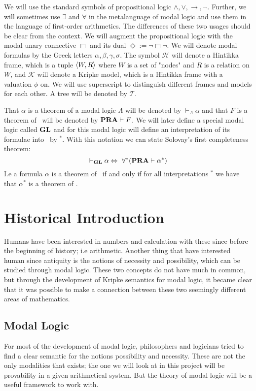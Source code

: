 \documentclass[../main.tex]{subfiles}
\begin{document}
We will use the standard symbols of propositional  logic
$\wedge,\vee,\rightarrow,\neg$. Further, we will sometimes use $\exists$ and
$\forall$ in the metalanguage of modal logic and use them in the language of
first-order arithmetics. The differences of these two usages should be clear
from the context. We will augment the propositional logic with the modal unary
connective $\Box$ and its dual $\Diamond:=\neg\Box\neg$. We will denote modal
formulas by the Greek letters $\alpha,\beta,\gamma,\sigma$. The symbol
$\mathcal{H}$ will denote a
Hintikka frame,  which is a tuple $\langle W,R\rangle$ where $W$ is a set of "nodes" and
$R$ is a relation on $W$, and
$\mathcal{K}$ will denote a Kripke model, which is a Hintikka frame with a
valuation $\phi$ on. We will use superscript to distinguish different frames
and models for each other.
A tree will be denoted by $\mathcal{T}$.

That $\alpha$ is a theorem of a modal logic $\Lambda$ will be denoted by
$\vdash_\Lambda\alpha$ and that $F$ is a theorem of \PRA\ will be denoted by
$\text{\textbf{PRA}}\vdash F$. We will later define a special modal logic called $\text{\textbf{GL}}$ and for
this modal logic will define an interpretation of its formulae into \PRA\ by
$^*$. With this notation we can state Solovay's first completeness theorem:
\[\vdash_{\text{\textbf{GL}}}\alpha\Leftrightarrow\ \forall ^*(\text{\textbf{PRA}}\vdash\alpha^*)\]
I.e a formula $\alpha$ is a theorem of \GL\ if and only if for all
interpretations $^*$ we have that $\alpha^*$ is a theorem of \PRA.

\section{Historical Introduction}
Humans have been interested in numbers and calculation with these since before
the beginning of history; i.e arithmetic. Another thing that have interested
human since antiquity is the notions of necessity and possibility, which can be
studied through modal logic. These two
concepts do not have much in common, but through the development of Kripke
semantics for modal logic, it became clear that it was possible to make a
connection between these two seemingly different areas of mathematics.

\subsection{Modal Logic}

For most of the development of modal logic, philosophers and logicians tried to
find a clear semantic for the notions possibility and necessity. These are not
the only modalities that exists; the one we will look at in this project will
be provability in a given arithmetical system. But the theory of modal logic
will be a useful framework to work with.
\end{document}
